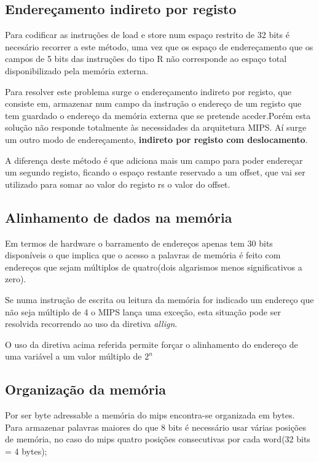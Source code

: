\documentclass[10pt,a4paper]{book}
\begin{document}
	 \subsection{Endereçamento indireto por registo}

	 		Para codificar as instruções de load e store num espaço restrito de 32 bits é necesário recorrer a este método, uma vez que os espaço de endereçamento que os campos de 5 bits das instruções do tipo R não corresponde ao espaço total disponibilizado pela memória externa.

			Para resolver este problema surge o endereçamento indireto por registo, que consiste em, armazenar num campo da instrução o endereço de um registo que tem guardado o endereço da memória externa que se pretende aceder.Porém esta solução não responde totalmente às necessidades da arquitetura MIPS. Aí surge um outro modo de endereçamento, \textbf{indireto por registo com deslocamento}.

			A diferença deste método é que adiciona mais um campo para poder endereçar um segundo registo,
			ficando o espaço restante reservado a um offset, que vai ser utilizado para somar ao valor do registo rs o valor do offset.
		\subsection{Alinhamento de dados na memória}

    Em termos de hardware o barramento de endereços apenas tem 30 bits disponíveis o que implica que o acesso a palavras de memória é feito com endereços que sejam múltiplos de quatro(dois algarismos menos significativos a zero).

		Se numa instrução de escrita ou leitura da memória for indicado um endereço que não seja múltiplo de 4 o MIPS lança uma exceção, esta situação pode ser resolvida recorrendo ao uso da diretiva \textit{allign}.

		O uso da diretiva acima referida permite forçar o alinhamento do endereço de uma variável a um valor múltiplo de $2^n$

	 \subsection{Organização da memória}

	 	Por ser byte adressable a memória do mips encontra-se organizada em bytes.
		Para armazenar palavras maiores do que 8 bits é necessário usar várias posições de memória, no caso do mips quatro posições consecutivas por cada word(32 bits = 4 bytes);
\end{document}

